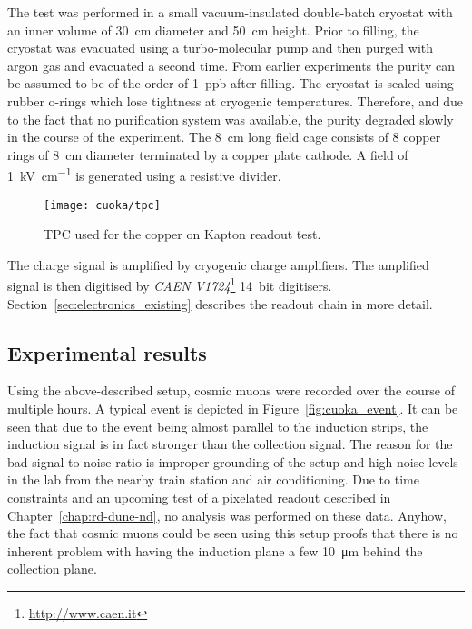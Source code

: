 The test was performed in a small vacuum-insulated double-batch cryostat with an inner volume of \SI{30}{\centi\metre} diameter and \SI{50}{\centi\metre} height. %
Prior to filling, the cryostat was evacuated using a turbo-molecular pump and then purged with argon gas and evacuated a second time.
From earlier experiments the purity can be assumed to be of the order of \SI{1}{ppb} after filling.
The cryostat is sealed using rubber o-rings which lose tightness at cryogenic temperatures.
Therefore, and due to the fact that no purification system was available, the purity degraded slowly in the course of the experiment.
The \SI{8}{\centi\metre} long field cage consists of \num{8} copper rings of \SI{8}{\centi\metre} diameter terminated by a copper plate cathode.
A field of \SI{1}{\kilo\volt\per\centi\metre} is generated using a resistive divider.

\begin{figure}[htb]
	\centering
	\texttt{[image: cuoka/tpc]}
	\caption{TPC used for the copper on Kapton readout test.}
	\label{fig:cuoka_tpc}
\end{figure}

The charge signal is amplified by cryogenic charge amplifiers.
The amplified signal is then digitised by \emph{CAEN V1724}\footnote{\href{http://www.caen.it}{http://www.caen.it}} \SI{14}{bit} digitisers.
Section~\ref{sec:electronics_existing} describes the readout chain in more detail.


\subsection*{Experimental results}

Using the above-described setup, cosmic muons were recorded over the course of multiple hours.
A typical event is depicted in Figure~\ref{fig:cuoka_event}.
It can be seen that due to the event being almost parallel to the induction strips, the induction signal is in fact stronger than the collection signal.
The reason for the bad signal to noise ratio is improper grounding of the setup and high noise levels in the lab from the nearby train station and air conditioning.
Due to time constraints and an upcoming test of a pixelated readout described in Chapter~\ref{chap:rd-dune-nd}, no analysis was performed on these data.
Anyhow, the fact that cosmic muons could be seen using this setup proofs that there is no inherent problem with having the induction plane a few \SI{10}{\micro\metre} behind the collection plane.

